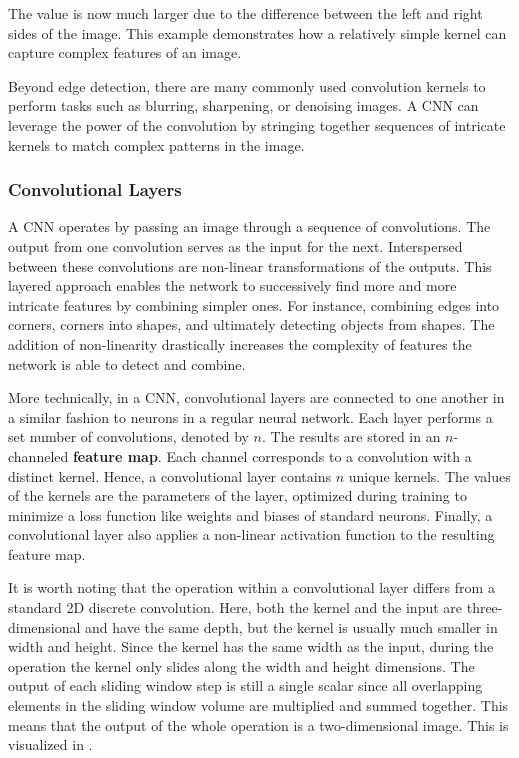The value is now much larger due to the difference between the left and right sides of the image. This example demonstrates how a relatively simple kernel can capture complex features of an image.

Beyond edge detection, there are many commonly used convolution kernels to perform tasks such as blurring, sharpening, or denoising images. A CNN can leverage the power of the convolution by stringing together sequences of intricate kernels to match complex patterns in the image.

\subsubsection{Convolutional Layers}

A CNN operates by passing an image through a sequence of convolutions. The output from one convolution serves as the input for the next. Interspersed between these convolutions are non-linear transformations of the outputs. This layered approach enables the network to successively find more and more intricate features by combining simpler ones. For instance, combining edges into corners, corners into shapes, and ultimately detecting objects from shapes. The addition of non-linearity drastically increases the complexity of features the network is able to detect and combine.

More technically, in a CNN, convolutional layers are connected to one another in a similar fashion to neurons in a regular neural network. Each layer performs a set number of convolutions, denoted by $n$. The results are stored in an $n$-channeled \textbf{feature map}. Each channel corresponds to a convolution with a distinct kernel. Hence, a convolutional layer contains $n$ unique kernels. The values of the kernels are the parameters of the layer, optimized during training to minimize a loss function like weights and biases of standard neurons. Finally, a convolutional layer also applies a non-linear activation function to the resulting feature map.

It is worth noting that the operation within a convolutional layer differs from a standard 2D discrete convolution. Here, both the kernel and the input are three-dimensional and have the same depth, but the kernel is usually much smaller in width and height. Since the kernel has the same width as the input, during the operation the kernel only slides along the width and height dimensions. The output of each sliding window step is still a single scalar since all overlapping elements in the sliding window volume are multiplied and summed together. This means that the output of the whole operation is a two-dimensional image. This is visualized in .

